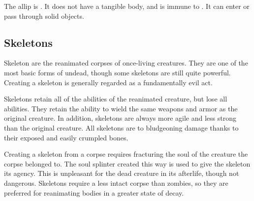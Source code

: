       The allip is .
      It does not have a tangible body, and is immune to .
      It can enter or pass through solid objects.
  
    \subsection{Skeletons}
      
      Skeleton are the reanimated corpses of once-living creatures.
      They are one of the most basic forms of undead, though some skeletons are still quite powerful.
      Creating a skeleton is generally regarded as a fundamentally evil act.
    
      Skeletons retain all of the  abilities of the reanimated creature, but lose all  abilities.
      They retain the ability to wield the same weapons and armor as the original creature.
      In addition, skeletons are always more agile and less strong than the original creature.
      All skeletons are  to bludgeoning damage thanks to their exposed and easily crumpled bones.
    
      Creating a skeleton from a corpse requires fracturing the soul of the creature the corpse belonged to.
      The soul splinter created this way is used to give the skeleton its agency.
      This is unpleasant for the dead creature in its afterlife, though not dangerous.
      Skeletons require a less intact corpse than zombies, so they are preferred for reanimating bodies in a greater state of decay.
    

